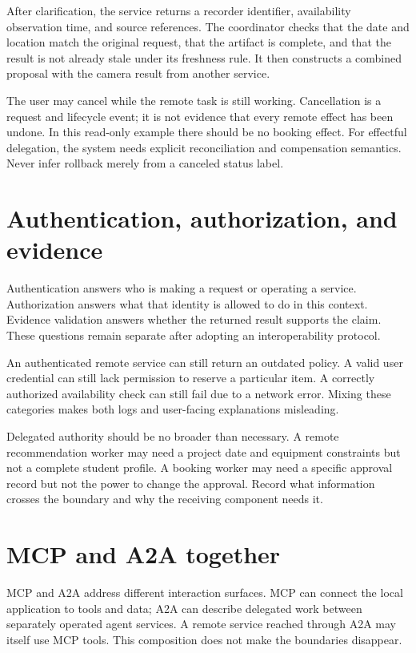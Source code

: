 After clarification, the service returns a recorder identifier, availability observation time, and source references. The coordinator checks that the date and location match the original request, that the artifact is complete, and that the result is not already stale under its freshness rule. It then constructs a combined proposal with the camera result from another service.

The user may cancel while the remote task is still working. Cancellation is a request and lifecycle event; it is not evidence that every remote effect has been undone. In this read-only example there should be no booking effect. For effectful delegation, the system needs explicit reconciliation and compensation semantics. Never infer rollback merely from a canceled status label.

\section{Authentication, authorization, and evidence}
Authentication answers who is making a request or operating a service. Authorization answers what that identity is allowed to do in this context. Evidence validation answers whether the returned result supports the claim. These questions remain separate after adopting an interoperability protocol.

An authenticated remote service can still return an outdated policy. A valid user credential can still lack permission to reserve a particular item. A correctly authorized availability check can still fail due to a network error. Mixing these categories makes both logs and user-facing explanations misleading.

Delegated authority should be no broader than necessary. A remote recommendation worker may need a project date and equipment constraints but not a complete student profile. A booking worker may need a specific approval record but not the power to change the approval. Record what information crosses the boundary and why the receiving component needs it.

\section{MCP and A2A together}
MCP and A2A address different interaction surfaces. MCP can connect the local application to tools and data; A2A can describe delegated work between separately operated agent services. A remote service reached through A2A may itself use MCP tools. This composition does not make the boundaries disappear.

